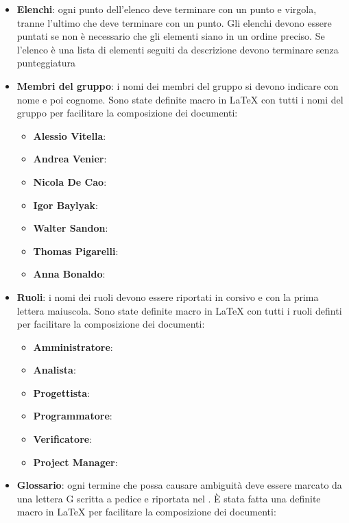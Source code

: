 \documentclass[12pt,a4paper]{article}
\begin{document}
\begin{itemize}
  \item \textbf{Elenchi}: ogni punto dell’elenco deve terminare con un punto e virgola, tranne l’ultimo che deve terminare con un punto. Gli elenchi devono essere puntati se non è necessario che gli elementi siano in un ordine preciso. Se l'elenco è una lista di elementi seguiti da descrizione devono terminare senza punteggiatura
  \item \textbf{Membri del gruppo}: i nomi dei membri del gruppo si devono indicare con nome e poi cognome. Sono state definite macro in \LaTeX{} con tutti i nomi del gruppo per facilitare la composizione dei documenti:
  \begin{itemize}
    \item \textbf{Alessio Vitella}: 
    \item \textbf{Andrea Venier}: 
    \item \textbf{Nicola De Cao}: 
    \item \textbf{Igor Baylyak}: 
    \item \textbf{Walter Sandon}: 
    \item \textbf{Thomas Pigarelli}: 
    \item \textbf{Anna Bonaldo}: 
  \end{itemize}
  \item \textbf{Ruoli}: i nomi dei ruoli devono essere riportati in corsivo e con la prima lettera maiuscola. Sono state definite macro in \LaTeX{} con tutti i ruoli definti per facilitare la composizione dei documenti:
  \begin{itemize}
    \item \textbf{Amministratore}: 
    \item \textbf{Analista}: 
    \item \textbf{Progettista}: 
    \item \textbf{Programmatore}: 
    \item \textbf{Verificatore}: 
    \item \textbf{Project Manager}: 
  \end{itemize}
  \item \textbf{Glossario}: ogni termine che possa causare ambiguità deve essere marcato da una lettera G scritta a pedice e riportata nel \GlO. È stata fatta una definite macro in \LaTeX{} per facilitare la composizione dei documenti: 

\end{itemize}
\end{document}
